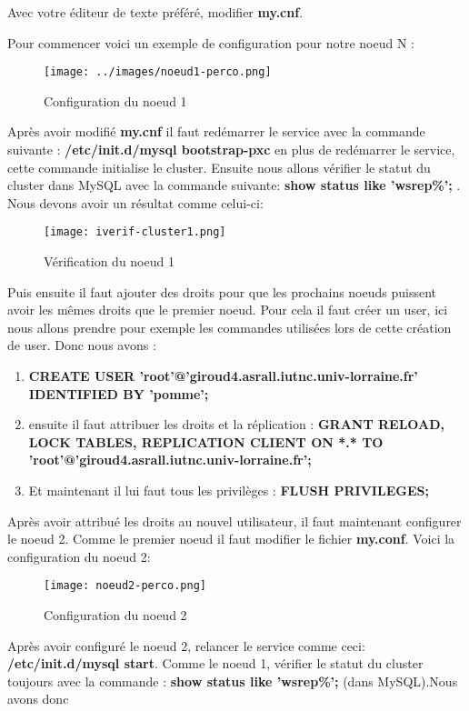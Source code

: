 \documentclass[a4paper,10pt,one side,titlepage]{report}
\begin{document}
Avec votre éditeur de texte préféré, modifier \textbf{my.cnf}.

Pour commencer voici un exemple de configuration pour notre noeud N :
\begin{figure}[h]
    \centering
\texttt{[image: ../images/noeud1-perco.png]}    
    \caption{Configuration du noeud 1}
    \label{fig:ConfigNoeud1}
\end{figure}
Après avoir modifié \textbf{my.cnf} il faut redémarrer le service avec la commande suivante : \textbf{/etc/init.d/mysql bootstrap-pxc}
en plus de redémarrer le service, cette commande initialise le cluster.
Ensuite nous allons vérifier le statut du cluster dans MySQL avec la commande suivante:
\textbf{show status like 'wsrep\%';} .
Nous devons avoir un résultat comme celui-ci:
\begin{figure}[H]
    \centering
 \texttt{[image: iverif-cluster1.png]} 
	\caption{Vérification du noeud 1}
    \label{fig:VerifNoeud1}
\end{figure}
 Puis ensuite il faut ajouter des droits pour que les prochains noeuds puissent avoir les mêmes droits que le premier noeud. Pour cela il faut créer un user, ici nous allons prendre pour exemple les commandes utilisées lors de cette création de user. 
 Donc nous avons : 
 \begin{enumerate}
 \item \textbf{CREATE USER 'root'@'giroud4.asrall.iutnc.univ-lorraine.fr' IDENTIFIED BY 'pomme';}
 \item ensuite il faut attribuer les droits et la réplication : \textbf{GRANT RELOAD, LOCK TABLES, REPLICATION CLIENT ON *.* TO 'root'@'giroud4.asrall.iutnc.univ-lorraine.fr';}
 \item Et maintenant il lui faut tous les privilèges : \textbf{FLUSH PRIVILEGES;}
 \end{enumerate}
 
Après avoir attribué les droits au nouvel utilisateur, il faut maintenant configurer le noeud 2.
Comme le premier noeud il faut modifier le fichier \textbf{my.conf}.
Voici la configuration du noeud 2:
\begin{figure}[h]
    \centering
\texttt{[image: noeud2-perco.png]} 
    \caption{Configuration du noeud 2}
    \label{fig:ConfigNoeud2}
\end{figure}
Après avoir configuré le noeud 2, relancer le service comme ceci: \textbf{/etc/init.d/mysql start}.
Comme le noeud 1, vérifier le statut du cluster toujours avec la commande :
\textbf{show status like 'wsrep\%';} (dans MySQL).Nous avons donc 
\end{document}
